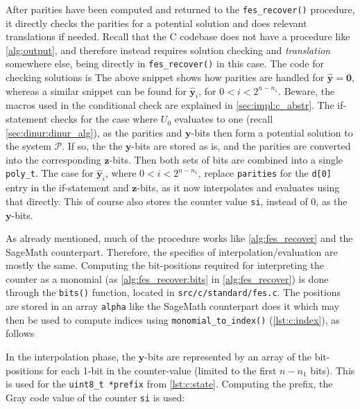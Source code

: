After parities have been computed and returned to the \texttt{fes\_recover()} procedure, it directly checks the parities for a potential solution and does relevant translations if needed. Recall that the C codebase does not have a procedure like \cref{alg:output}, and therefore instead requires solution checking and \textit{translation} somewhere else, being directly in \texttt{fes\_recover()} in this case. The code for checking solutions is 
The above snippet shows how parities are handled for $\hat{\mathbf{y}} = \mathbf{0}$, whereas a similar snippet can be found for $\hat{\mathbf{y}}_i$, for $0 < i < 2^{n - n_1}$. Beware, the macros used in the conditional check are explained in \cref{sec:impl:c_abstr}. The if-statement checks for the case where $U_0$ evaluates to one (recall \cref{sec:dinur:dinur_alg}), as the parities and $\mathbf{y}$-bits then form a potential solution to the system $\mathcal{P}$. If so, the the $\mathbf{y}$-bits are stored as is, and the parities are converted into the corresponding $\mathbf{z}$-bits. Then both sets of bits are combined into a single \texttt{poly\_t}. The case for $\hat{\mathbf{y}}_i$, where $0 < i < 2^{n - n_1}$, replace \texttt{parities} for the \texttt{d[0]} entry in the if-statement and $\mathbf{z}$-bits, as it now interpolates and evaluates using that directly. This of course also stores the counter value \texttt{si}, instead of 0, as the $\mathbf{y}$-bits. 

As already mentioned, much of the procedure works like \cref{alg:fes_recover} and the SageMath counterpart. Therefore, the specifics of interpolation/evaluation are mostly the same. Computing the bit-positions required for interpreting the counter as a monomial (as \cref{alg:fes_recover:bits} in \cref{alg:fes_recover}) is done through the \texttt{bits()} function, located in \texttt{src/c/standard/fes.c}. The positions are stored in an array \texttt{alpha} like the SageMath counterpart does it 
which may then be used to compute indices using \texttt{monomial\_to\_index()} (\cref{lst:c:index}), as follows

In the interpolation phase, the $\mathbf{y}$-bits are represented by an array of the bit-positions for each 1-bit in the counter-value (limited to the first $n - n_1$ bits). This is used for the \texttt{uint8\_t *prefix} from \cref{lst:c:state}. Computing the prefix, the Gray code value of the counter \texttt{si} is used:


